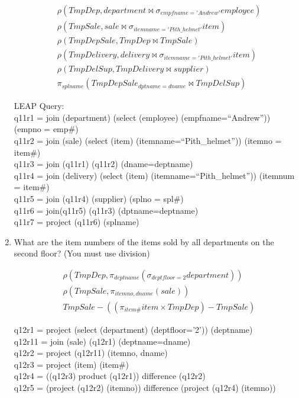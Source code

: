 \documentclass[10pt]{article}
\begin{document}
\begin{enumerate}
  \begin{align*}
    &\rho(TmpDep, department \bowtie
    \sigma_{empfname='Andrew'}employee)\\
    &\rho(TmpSale, sale \bowtie
    \sigma_{itemname='Pith\_helmet'}item)\\
    &\rho(TmpDepSale, TmpDep \bowtie TmpSale)\\
    &\rho(TmpDelivery, delivery \bowtie
    \sigma_{itemname='Pith\_helmet'}item)\\
    &\rho(TmpDelSup, TmpDelivery \bowtie supplier)\\
    &\pi_{splname}(TmpDepSale_{dptname=dname} \bowtie TmpDelSup)
  \end{align*}

  LEAP Query:\\
  q11r1 = join (department) (select (employee)
  (empfname=``Andrew'')) (empno = emp\#)\\
  q11r2 = join (sale) (select (item) (itemname=``Pith\_helmet''))
  (itemno = item\#)\\
  q11r3 = join (q11r1) (q11r2) (dname=deptname)\\
  q11r4 = join (delivery) (select (item) (itemname=``Pith\_helmet''))
  (itemnum = item\#)\\
  q11r5 = join (q11r4) (supplier) (splno = spl\#)\\
  q11r6 = join(q11r5) (q11r3) (dptname=deptname) \\
  q11r7 = project (q11r6) (splname)

\item What are the item numbers of the items sold by all departments
  on the second floor? (You must use division)

  \begin{align*}
    &\rho(TmpDep, \pi_{deptname}(\sigma_{deptfloor=2}department))\\
    &\rho(TmpSale, \pi_{itemno, dname}(sale))\\
    &TmpSale - ((\pi_{item\#}item \times TmpDep) - TmpSale)
  \end{align*}

  q12r1 = project (select (department) (deptfloor='2')) (deptname)\\
  q12r11 = join (sale) (q12r1) (deptname=dname)\\
  q12r2 = project (q12r11) (itemno, dname)\\
  q12r3 = project (item) (item\#)\\
  q12r4 = ((q12r3) product (q12r1)) difference (q12r2)\\
  q12r5 = (project (q12r2) (itemno)) difference (project (q12r4) (itemno))

\end{enumerate}
\end{document}

